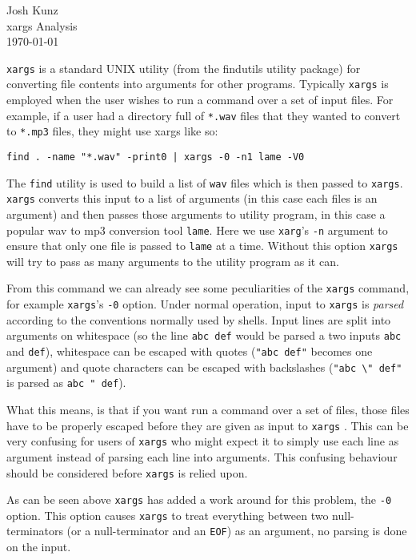 \documentclass{article}
\newcommand{\header}[2]{%
    \begin{flushright}
    #1 \\
    #2 \\
    \today \\
    \end{flushright}%
}
\newcommand{\xargs}{\texttt{xargs} }
\begin{document}
\header{Josh Kunz}{xargs Analysis}

\xargs is a standard UNIX utility (from the findutils utility package) for
converting file contents into arguments for other programs. Typically \xargs is
employed when the user wishes to run a command over a set of input files. For
example, if a user had a directory full of \texttt{*.wav} files that they wanted
to convert to \texttt{*.mp3} files, they might use xargs like so:

\begin{center}
\verb$find . -name "*.wav" -print0 | xargs -0 -n1 lame -V0$
\end{center}

The \texttt{find} utility is used to build a list of \texttt{wav} files which
is then passed to \texttt{xargs}. \xargs converts this input to a list of arguments
(in this case each files is an argument) and then passes those arguments to 
utility program, in this case a popular wav to mp3 conversion tool \texttt{lame}.
Here we use \texttt{xarg}'s \verb|-n| argument to ensure that only one file is
passed to \texttt{lame} at a time. Without this option \xargs will try to pass
as many arguments to the utility program as it can.

From this command we can already see some peculiarities of the \xargs command,
for example \texttt{xargs}'s \verb|-0| option. Under normal operation, input to 
\xargs is \textit{parsed} according to the conventions normally used by shells.
Input lines are split into arguments on whitespace (so the line \texttt{abc def}
would be parsed a two inputs \texttt{abc} and \texttt{def}), whitespace can
be escaped with quotes (\texttt{"abc def"} becomes one argument) and quote
characters can be escaped with backslashes (\texttt{"abc \textbackslash" def"}
is parsed as \texttt{abc " def}).

What this means, is that if you want run a command over a set of files, those
files have to be properly escaped before they are given as input to \xargs. This
can be very confusing for users of \xargs who might expect it to simply use each
line as argument instead of parsing each line into arguments. This confusing
behaviour should be considered before \xargs is relied upon.

As can be seen above \xargs has added a work around for this problem, the 
\verb|-0| option. This option causes \xargs to treat everything between two 
null-terminators (or a null-terminator and an \texttt{EOF}) as an argument, no
parsing is done on the input.
\end{document}

